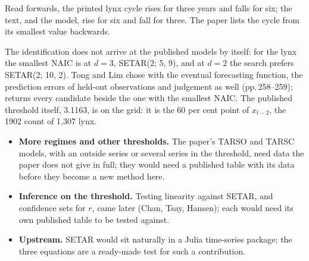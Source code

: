 Read forwards, the printed lynx cycle rises for three years and falls for six; the text, and the model, rise for six
and fall for three. The paper lists the cycle from its smallest value backwards.

The identification does not arrive at the published models by itself: for the lynx the smallest NAIC is at $d = 3$,
SETAR(2; 5, 9), and at $d = 2$ the search prefers SETAR(2; 10, 2). Tong and Lim chose with the eventual forecasting
function, the prediction errors of held-out observations and judgement as well (pp.\,258--259);  returns
every candidate beside the one with the smallest NAIC. The published threshold itself, 3.1163, is on the grid: it is the
60 per cent point of $x_{t-2}$, the 1902 count of 1,307 lynx.

\begin{itemize}
  \item \textbf{More regimes and other thresholds.} The paper's TARSO and TARSC models, with an outside series or several
    series in the threshold, need data the paper does not give in full; they would need a published table with its data
    before they become a new method here.
  \item \textbf{Inference on the threshold.} Testing linearity against SETAR, and confidence sets for $r$, came later
    (Chan, Tsay, Hansen); each would need its own published table to be tested against.
  \item \textbf{Upstream.} SETAR would sit naturally in a Julia time-series package; the three equations are a
    ready-made test for such a contribution.
\end{itemize}

{\footnotesize
{}
}

\nmcredit

